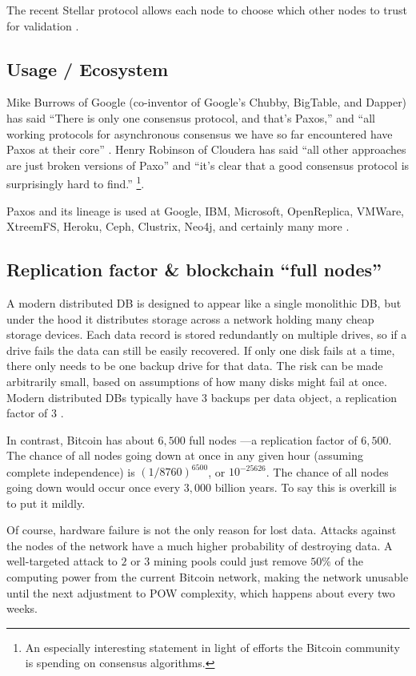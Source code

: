 The recent Stellar protocol allows each node to choose which other nodes to trust for validation \cite{mazieres2015stellar}.

\subsection{Usage / Ecosystem}
Mike Burrows of Google (co-inventor of Google’s Chubby, BigTable, and Dapper) has said ``There is only one consensus protocol, and that’s Paxos,'' \cite{robinson2009paxos} and ``all working protocols for asynchronous consensus we have so far encountered have Paxos at their core'' \cite{burrows2006chubby}.
Henry Robinson of Cloudera has said ``all other approaches are just broken versions of Paxo'' and ``it’s clear that a good consensus protocol is surprisingly hard to find.'' \cite{robinson2009paxos}\footnote{An especially interesting statement in light of efforts the Bitcoin community is spending on consensus algorithms.}.

Paxos and its lineage is used at Google, IBM, Microsoft, OpenReplica, VMWare, XtreemFS, Heroku, Ceph, Clustrix, Neo4j, and certainly many more \cite{wiki_paxos}.

\subsection{Replication factor \& blockchain “full nodes”}
A modern distributed DB is designed to appear like a single monolithic DB, but under the hood it distributes storage across a network holding many cheap storage devices.
Each data record is stored redundantly on multiple drives, so if a drive fails the data can still be easily recovered.
If only one disk fails at a time, there only needs to be one backup drive for that data.
The risk can be made arbitrarily small, based on assumptions of how many disks might fail at once.
Modern distributed DBs typically have 3 backups per data object, a replication factor of $3$ \cite{wiki_raid}.

In contrast, Bitcoin has about $6,500$ full nodes \cite{bitcoin2015fees}—a replication factor of $6,500$.
The chance of all nodes going down at once in any given hour (assuming complete independence) is $(1/8760)^{6500}$, or $10^{-25626}$.
The chance of all nodes going down would occur once every $3,000$ billion years. To say this is overkill is to put it mildly.

Of course, hardware failure is not the only reason for lost data.
Attacks against the nodes of the network have a much higher probability of destroying data.
A well-targeted attack to $2$ or $3$ mining pools could just remove $50\%$ of the computing power from the current Bitcoin network, making the network unusable until the next adjustment to POW complexity, which happens about every two weeks.

